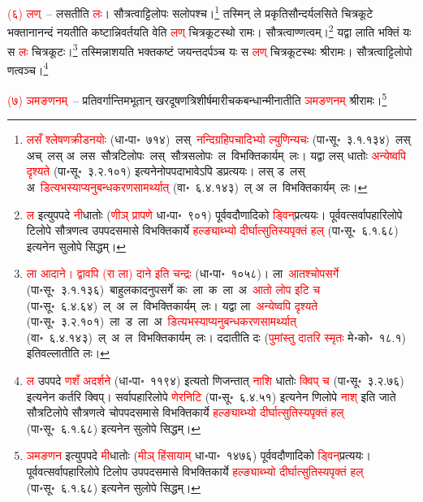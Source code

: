 \begin{sloppypar}\justifying\noindent\hspace{10mm} \textcolor{red}{(६) लण्}~– लसतीति \textcolor{red}{लः}। सौत्रत्वाट्टिलोपः सलोपश्च।\footnote{\textcolor{red}{लसँ श्लेषण\-क्रीडनयोः} (धा॰पा॰~७१४)~\arrow लस्~\arrow \textcolor{red}{नन्दि\-ग्रहि\-पचादिभ्यो ल्युणिन्यचः} (पा॰सू॰~३.१.१३४)~\arrow लस् अच्~\arrow लस् अ~\arrow लस~\arrow सौत्रटिलोपः~\arrow लस्~\arrow सौत्रसलोपः~\arrow ल~\arrow विभक्तिकार्यम्~\arrow लः। यद्वा लस् धातोः \textcolor{red}{अन्येष्वपि दृश्यते} (पा॰सू॰~३.२.१०१) इत्यनेनोपपदाभावेऽपि डप्रत्ययः। लस् ड~\arrow लस् अ~\arrow \textcolor{red}{डित्यभस्याप्यनु\-बन्धकरण\-सामर्थ्यात्} (वा॰~६.४.१४३)~\arrow ल् अ~\arrow ल~\arrow विभक्तिकार्यम्~\arrow लः।} तस्मिन् ले प्रकृति\-सौन्दर्य\-लसिते चित्रकूटे भक्तानानन्दं नयतीति कष्टान्निवर्तयति वेति \textcolor{red}{लण्} चित्रकूटस्थो रामः। सौत्रत्वाण्णत्वम्।\footnote{\textcolor{red}{ल} इत्युपपदे \textcolor{red}{नी}\-धातोः (\textcolor{red}{णीञ् प्रापणे} धा॰पा॰~९०१) पूर्ववदौणादिको \textcolor{red}{ड्विन्‌}\-प्रत्ययः। पूर्ववत्सर्वापहारि\-लोपे टिलोपे सौत्रणत्व उपपद\-समासे विभक्तिकार्ये \textcolor{red}{हल्ङ्याब्भ्यो दीर्घात्सुतिस्यपृक्तं हल्} (पा॰सू॰~६.१.६८) इत्यनेन सुलोपे सिद्धम्।} यद्वा लाति भक्तिं यः स \textcolor{red}{लः} चित्र\-कूटः।\footnote{\textcolor{red}{ला आदाने। द्वावपि (रा ला) दाने इति चन्द्रः} (धा॰पा॰~१०५८)। ला~\arrow \textcolor{red}{आतश्चोपसर्गे} (पा॰सू॰~३.१.१३६)~\arrow बाहुलकादनुपसर्गे कः~\arrow ला~क~\arrow ला~अ~\arrow \textcolor{red}{आतो लोप इटि च} (पा॰सू॰~६.४.६४)~\arrow ल्~अ~\arrow ल~\arrow विभक्तिकार्यम्~\arrow लः। यद्वा ला~\arrow \textcolor{red}{अन्येष्वपि दृश्यते} (पा॰सू॰~३.२.१०१)~\arrow ला~ड~\arrow ला~अ~\arrow \textcolor{red}{डित्यभस्याप्यनु\-बन्धकरण\-सामर्थ्यात्} (वा॰~६.४.१४३)~\arrow ल्~अ~\arrow ल~\arrow विभक्तिकार्यम्~\arrow लः। ददातीति दः (\textcolor{red}{पुमांस्तु दातरि स्मृतः} मे॰को॰~१८.१) इतिवल्लातीति लः।} तस्मिन्नाशयति भक्तकष्टं जयन्त\-दर्पञ्च यः स \textcolor{red}{लण्} चित्रकूटस्थः श्रीरामः। सौत्रत्वाट्टिलोपो णत्वञ्च।\footnote{\textcolor{red}{ल} उपपदे \textcolor{red}{णशँ अदर्शने} (धा॰पा॰~११९४) इत्यतो णिजन्तात् \textcolor{red}{नाशि} धातोः \textcolor{red}{क्विप् च} (पा॰सू॰~३.२.७६) इत्यनेन कर्तरि क्विप्। सर्वापहारि\-लोपे \textcolor{red}{णेरनिटि} (पा॰सू॰~६.४.५१) इत्यनेन णिलोपे \textcolor{red}{नाश्} इति जाते सौत्रटिलोपे सौत्रणत्वे चोपपद\-समासे विभक्तिकार्ये \textcolor{red}{हल्ङ्याब्भ्यो दीर्घात्सुतिस्यपृक्तं हल्} (पा॰सू॰~६.१.६८) इत्यनेन सुलोपे सिद्धम्।}\end{sloppypar}
\begin{sloppypar}\justifying\noindent\hspace{10mm} \textcolor{red}{(७) ञमङणनम्}~– प्रतिवर्गान्तिम\-भूतान् खर\-दूषण\-त्रिशीर्ष\-मारीच\-कबन्धान्मीनातीति \textcolor{red}{ञमङणनम्} श्रीरामः।\footnote{\textcolor{red}{ञमङणन} इत्युपपदे \textcolor{red}{मी}\-धातोः (\textcolor{red}{मीञ् हिंसायाम्} धा॰पा॰~१४७६) पूर्ववदौणादिको \textcolor{red}{ड्विन्‌}\-प्रत्ययः। पूर्ववत्सर्वापहारि\-लोपे टिलोप उपपदसमासे विभक्तिकार्ये \textcolor{red}{हल्ङ्याब्भ्यो दीर्घात्सुतिस्यपृक्तं हल्} (पा॰सू॰~६.१.६८) इत्यनेन सुलोपे सिद्धम्।}\end{sloppypar}
